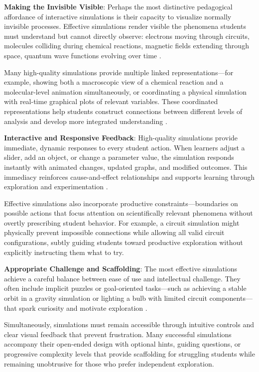 \textbf{Making the Invisible Visible}: Perhaps the most distinctive pedagogical affordance of interactive simulations is their capacity to visualize normally invisible processes. Effective simulations render visible the phenomena students must understand but cannot directly observe: electrons moving through circuits, molecules colliding during chemical reactions, magnetic fields extending through space, quantum wave functions evolving over time \cite{phet2023, finkelstein2005phet}.

Many high-quality simulations provide multiple linked representations—for example, showing both a macroscopic view of a chemical reaction and a molecular-level animation simultaneously, or coordinating a physical simulation with real-time graphical plots of relevant variables. These coordinated representations help students construct connections between different levels of analysis and develop more integrated understanding \cite{phet2023}.

\textbf{Interactive and Responsive Feedback}: High-quality simulations provide immediate, dynamic responses to every student action. When learners adjust a slider, add an object, or change a parameter value, the simulation responds instantly with animated changes, updated graphs, and modified outcomes. This immediacy reinforces cause-and-effect relationships and supports learning through exploration and experimentation \cite{phet2023}.

Effective simulations also incorporate productive constraints—boundaries on possible actions that focus attention on scientifically relevant phenomena without overtly prescribing student behavior. For example, a circuit simulation might physically prevent impossible connections while allowing all valid circuit configurations, subtly guiding students toward productive exploration without explicitly instructing them what to try.

\textbf{Appropriate Challenge and Scaffolding}: The most effective simulations achieve a careful balance between ease of use and intellectual challenge. They often include implicit puzzles or goal-oriented tasks—such as achieving a stable orbit in a gravity simulation or lighting a bulb with limited circuit components—that spark curiosity and motivate exploration \cite{phet2023}.

Simultaneously, simulations must remain accessible through intuitive controls and clear visual feedback that prevent frustration. Many successful simulations accompany their open-ended design with optional hints, guiding questions, or progressive complexity levels that provide scaffolding for struggling students while remaining unobtrusive for those who prefer independent exploration.


